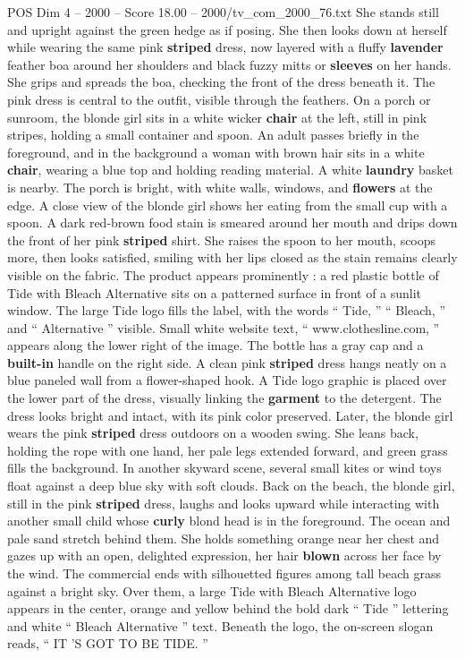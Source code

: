 \begin{textsample}{POS Dim 4 – 2000 – Score 18.00 – 2000/tv\_com\_2000\_76.txt}
She stands still and upright against the green hedge as if posing.
She then looks down at herself while wearing the same pink \textbf{striped} dress, now layered with a fluffy \textbf{lavender} feather boa around her shoulders and black fuzzy mitts or \textbf{sleeves} on her hands.
She grips and spreads the boa, checking the front of the dress beneath it.
The pink dress is central to the outfit, visible through the feathers.
On a porch or sunroom, the blonde girl sits in a white wicker \textbf{chair} at the left, still in pink stripes, holding a small container and spoon.
An adult passes briefly in the foreground, and in the background a woman with brown hair sits in a white \textbf{chair}, wearing a blue top and holding reading material.
A white \textbf{laundry} basket is nearby.
The porch is bright, with white walls, windows, and \textbf{flowers} at the edge.
A close view of the blonde girl shows her eating from the small cup with a spoon.
A dark red-brown food stain is smeared around her mouth and drips down the front of her pink \textbf{striped} shirt.
She raises the spoon to her mouth, scoops more, then looks satisfied, smiling with her lips closed as the stain remains clearly visible on the fabric.
The product appears prominently : a red plastic bottle of Tide with Bleach Alternative sits on a patterned surface in front of a sunlit window.
The large Tide logo fills the label, with the words “ Tide, ” “ Bleach, ” and “ Alternative ” visible.
Small white website text, “ www.clothesline.com, ” appears along the lower right of the image.
The bottle has a gray cap and a \textbf{built-in} handle on the right side.
A clean pink \textbf{striped} dress hangs neatly on a blue paneled wall from a flower-shaped hook.
A Tide logo graphic is placed over the lower part of the dress, visually linking the \textbf{garment} to the detergent.
The dress looks bright and intact, with its pink color preserved.
Later, the blonde girl wears the pink \textbf{striped} dress outdoors on a wooden swing.
She leans back, holding the rope with one hand, her pale legs extended forward, and green grass fills the background.
In another skyward scene, several small kites or wind toys float against a deep blue sky with soft clouds.
Back on the beach, the blonde girl, still in the pink \textbf{striped} dress, laughs and looks upward while interacting with another small child whose \textbf{curly} blond head is in the foreground.
The ocean and pale sand stretch behind them.
She holds something orange near her chest and gazes up with an open, delighted expression, her hair \textbf{blown} across her face by the wind.
The commercial ends with silhouetted figures among tall beach grass against a bright sky.
Over them, a large Tide with Bleach Alternative logo appears in the center, orange and yellow behind the bold dark “ Tide ” lettering and white “ Bleach Alternative ” text.
Beneath the logo, the on-screen slogan reads, “ IT ’S GOT TO BE TIDE. ”

\end{textsample}
